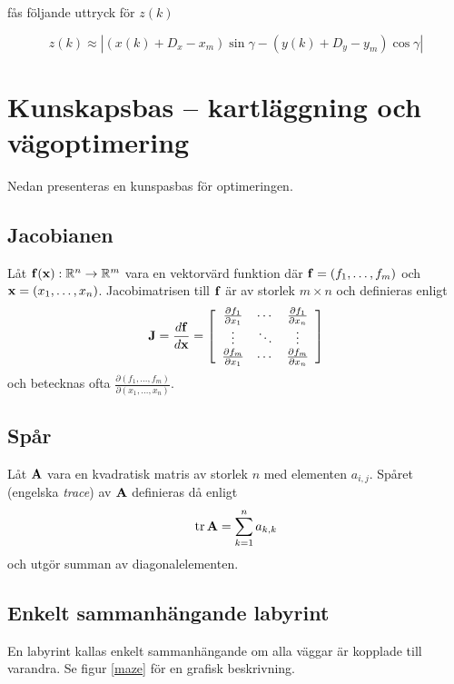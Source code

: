 \documentclass[11pt]{article}
\newcommand{\bfr}[1]{\textbf{\textrm{{#1}}}}
\begin{document}
\begin{flushleft}
fås följande uttryck för $z(k)$

\begin{equation}
	z(k) \approx |(x(k) + D_x - x_m) \sin \gamma - (y(k) + D_y - y_m) \cos \gamma |
\end{equation}

\section{Kunskapsbas -- kartläggning och vägoptimering}
Nedan presenteras en kunspasbas för optimeringen.
\subsection{Jacobianen}
Låt $\bfr{f}(\bfr{x}):\mathbb{R}^{n}\rightarrow\mathbb{R}^{m}$ vara en vektorvärd funktion där $\bfr{f}=\left(f_1,\ldots,f_m\right)$ och $\bfr{x}=\left(x_1,\ldots,x_n\right)$. Jacobimatrisen till $\bfr{f}$ är av storlek $m\times n$ och definieras enligt
\begin{equation*}
	\bfr{J} = \frac{d\bfr{f}}{d\bfr{x}} = \left[ \begin{array}{ccc}
		\frac{\partial f_1}{\partial x_1} & \cdots & \frac{\partial f_1}{\partial x_n} \\
		\vdots & \ddots & \vdots \\
		\frac{\partial f_m}{\partial x_1} & \cdots & \frac{\partial f_m}{\partial x_n}
	\end{array} \right]
\end{equation*}
och betecknas ofta $\frac{\partial \left(f_1,\ldots,f_m\right)}{\partial \left(x_1,\ldots,x_n \right)}$.

\subsection{Spår}
Låt $\bfr{A}$ vara en kvadratisk matris av storlek $n$ med elementen $a_{i,j}$. Spåret (engelska \emph{trace}) av $\bfr{A}$ definieras då enligt
\begin{equation*}
	\mathrm{tr}\,\bfr{A} = \sum_{k=1}^{n} a_{k,k}
\end{equation*}
och utgör summan av diagonalelementen.

\subsection{Enkelt sammanhängande labyrint}
En labyrint kallas enkelt sammanhängande om alla väggar är kopplade till varandra. Se figur \ref{maze} för en grafisk beskrivning.


\end{flushleft}
\end{document}
